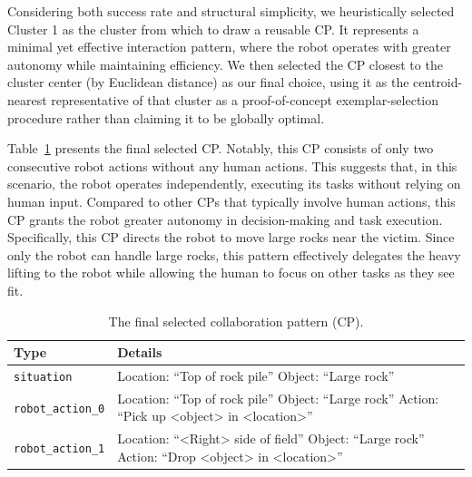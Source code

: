 \documentclass[letterpaper, 10 pt, conference]{ieeeconf}  %
\begin{document}
Considering both success rate and structural simplicity, we heuristically selected
Cluster 1 as the cluster from which to draw a reusable CP. It represents a minimal yet
effective interaction pattern, where the robot operates with greater autonomy while
maintaining efficiency. We then selected the CP closest to the cluster center (by
Euclidean distance) as our final choice, using it as the centroid-nearest representative
of that cluster as a proof-of-concept exemplar-selection procedure rather than claiming
it to be globally optimal.

Table~\ref{tab:final_cp} presents the final selected CP. Notably, this CP consists of
only two consecutive robot actions without any human actions. This suggests that, in
this scenario, the robot operates independently, executing its tasks without relying on
human input. Compared to other CPs that typically involve human actions, this CP grants
the robot greater autonomy in decision-making and task execution. Specifically, this CP
directs the robot to move large rocks near the victim. Since only the robot can handle
large rocks, this pattern effectively delegates the heavy lifting to the robot while
allowing the human to focus on other tasks as they see fit.

\begin{table}[tb]
    \centering
    \renewcommand{\arraystretch}{1.2}
    \setlength{\tabcolsep}{5pt}
    \begin{tabular}{lp{5cm}}
        \toprule
        \textbf{Type} & \textbf{Details} \\
        \midrule
        \texttt{situation} & Location: ``Top of rock pile'' \newline
                   Object: ``Large rock'' \\
        \midrule
        \texttt{robot\_action\_0} & Location: ``Top of rock pile'' \newline
                         Object: ``Large rock'' \newline
                         Action: ``Pick up \textless object\textgreater{} in \textless location\textgreater{}'' \\
        \midrule
        \texttt{robot\_action\_1} & Location: ``\textless Right\textgreater{} side of field'' \newline
                         Object: ``Large rock'' \newline
                         Action: ``Drop \textless object\textgreater{} in \textless location\textgreater{}'' \\
        \bottomrule
    \end{tabular}
    \caption{The final selected collaboration pattern (CP).}
    \label{tab:final_cp}
\end{table}
\end{document}

